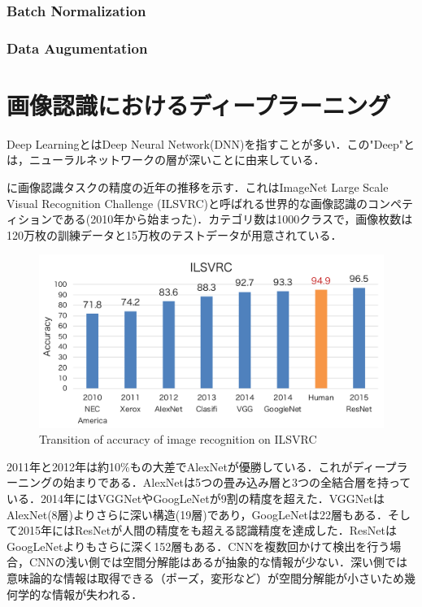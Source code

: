 \subsubsection*{Batch Normalization}


\subsubsection*{Data Augumentation}



\section{画像認識におけるディープラーニング}
Deep LearningとはDeep Neural Network(DNN)を指すことが多い．この"Deep"とは，ニューラルネットワークの層が深いことに由来している．

に画像認識タスクの精度の近年の推移を示す．これはImageNet Large Scale Visual Recognition Challenge (ILSVRC)と呼ばれる世界的な画像認識のコンペティションである(2010年から始まった)．カテゴリ数は1000クラスで，画像枚数は120万枚の訓練データと15万枚のテストデータが用意されている．
\begin{figure}[H]
	\centering
	\includegraphics[width=0.7\linewidth]{fig/ILSVRC}
	\caption{Transition of accuracy of image recognition on ILSVRC}
	\label{fig:ImageNet}
\end{figure}
2011年と2012年は約10\%もの大差でAlexNet\cite{AlexNet}が優勝している．これがディープラーニングの始まりである．AlexNetは5つの畳み込み層と3つの全結合層を持っている．2014年にはVGGNet\cite{VGGNet}やGoogLeNet\cite{GoogLeNet}が9割の精度を超えた．VGGNetはAlexNet(8層)よりさらに深い構造(19層)であり，GoogLeNetは22層もある．そして2015年にはResNet\cite{ResNet}が人間の精度をも超える認識精度を達成した．ResNetはGoogLeNetよりもさらに深く152層もある．CNNを複数回かけて検出を行う場合，CNNの浅い側では空間分解能はあるが抽象的な情報が少ない．深い側では意味論的な情報は取得できる（ポーズ，変形など）が空間分解能が小さいため幾何学的な情報が失われる．


